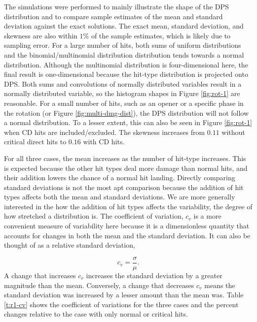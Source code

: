 \documentclass{article}
\begin{document}
            The simulations were performed to mainly illustrate the shape of the DPS distribution and to compare sample estimates of the mean and standard deviation against the exact solutions. The exact mean, standard deviation, and skewness are also within $1\%$ of the sample estimates, which is likely due to sampling error. For a large number of hits, both sums of uniform distributions and the binomial/multinomial distribution distribution tends towards a normal distribution. Although the multinomial distribution is four-dimensional here, the final result is one-dimensional because the hit-type distribution is projected onto DPS. Both sums and convolutions of normally distributed variables result in a normally distributed variable, so the histogram shapes in Figure \ref{fig:rot-1} are reasonable.  For a small number of hits, such as an opener or a specific phase in the rotation (or Figure \ref{fig:multi-dmg-dist}), the DPS distribution will not follow a normal distribution. To a lesser extent, this can also be seen in Figure \ref{fig:rot-1} when CD hits are included/excluded. The skewness increases from $0.11$ without critical direct hits to $0.16$ with CD hits. 

            For all three cases, the mean increases as the number of hit-type increases. This is expected because the other hit types deal more damage than normal hits, and their addition lowers the chance of a normal hit landing. Directly comparing standard deviations is not the most apt comparison because the addition of hit types affects both the mean and standard deviations. We are more generally interested in the how the addition of hit types affects the variability, the degree of how stretched a distribution is. The coefficient of variation, $c_v$ is a more convenient measure of variability here because it is a dimensionless quantity that accounts for changes in both the mean and the standard deviation. It can also be thought of as a relative standard deviation,

            \begin{equation}
                c_v = \frac{\sigma}{\mu}.
            \end{equation}
            A change that increases $c_v$ increases the standard deviation by a greater magnitude than the mean. Conversely, a change that decreases $c_v$ means the standard deviation was increased by a lesser amount than the mean was. Table \ref{t:r1-cv} shows the coefficient of variations for the three cases and the percent changes relative to the case with only normal or critical hits.
\end{document}
